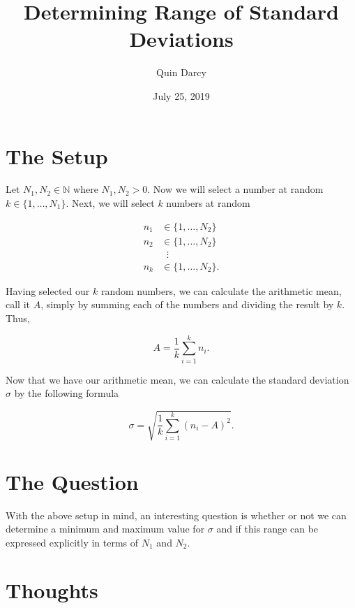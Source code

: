 \documentclass{article}
\theoremstyle{definition}
\theoremstyle{remark}
\theoremstyle{definition}
\begin{document}
\title{Determining Range of Standard Deviations}
\author{Quin Darcy}
\date{July 25, 2019}
\maketitle

\section{The Setup}

Let $N_1, N_2\in\mathbb{N}$ where $N_1,N_2>0$. Now we will select a number at random $k\in\{1,\dots, N_1\}$. Next, we will select $k$ numbers at random 

\begin{equation*}
    \begin{split}
        n_1&\in\{1,\dots, N_2\} \\
        n_2&\in\{1,\dots, N_2\} \\
           &\;\;\vdots              \\
        n_k&\in\{1,\dots,N_2\}.
    \end{split}
\end{equation*}

Having selected our $k$ random numbers, we can calculate the arithmetic mean, call it $A$, simply by summing each of the numbers and dividing the result by $k$. Thus, 

\begin{equation*}
    A=\frac{1}{k}\sum_{i=1}^{k}n_i.
\end{equation*}

\noindent Now that we have our arithmetic mean, we can calculate the standard deviation $\sigma$ by the following formula

\begin{equation*}
    \sigma=\sqrt{\frac{1}{k}\sum_{i=1}^{k}(n_i-A)^2}.
\end{equation*}

\section{The Question}

With the above setup in mind, an interesting question is whether or not we can determine a minimum and maximum value for $\sigma$ and if this range can be expressed explicitly in terms of $N_1$ and $N_2$.

\newpage

\section{Thoughts}
\end{document}
